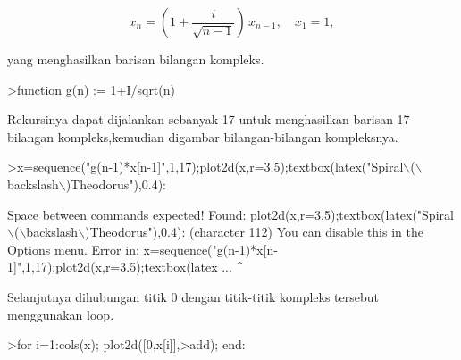 \documentclass[a4paper,10pt]{article}
\begin{document}
\begin{eulernotebook}
\begin{eulercomment}
\begin{eulercomment}
\begin{eulercomment}
\begin{eulercomment}
\begin{eulercomment}
\begin{eulercomment}
\begin{eulercomment}
\begin{eulercomment}
\begin{eulercomment}
\begin{eulercomment}
\begin{eulercomment}
\begin{eulercomment}
\begin{eulercomment}
\begin{eulercomment}
\begin{eulercomment}
\begin{eulercomment}
\begin{eulercomment}
\begin{eulercomment}
\begin{eulercomment}
\begin{eulercomment}
\begin{eulercomment}
\begin{eulercomment}
\begin{eulercomment}
\begin{eulercomment}
\begin{eulercomment}
\begin{eulercomment}
\begin{eulercomment}
\begin{eulercomment}
\begin{eulercomment}
\begin{eulercomment}
\begin{eulercomment}
\end{eulercomment}
\begin{eulerformula}
\[
x_n = \left( 1 + \frac{i}{\sqrt{n-1}} \right) \, x_{n-1}, \quad x_1=1,
\]
\end{eulerformula}
\begin{eulercomment}
yang menghasilkan barisan bilangan kompleks.
\end{eulercomment}
\begin{eulerprompt}
>function g(n) := 1+I/sqrt(n)
\end{eulerprompt}
\begin{eulercomment}
Rekursinya dapat dijalankan sebanyak 17 untuk menghasilkan barisan 17
bilangan kompleks,kemudian digambar bilangan-bilangan kompleksnya.
\end{eulercomment}
\begin{eulerprompt}
>x=sequence("g(n-1)*x[n-1]",1,17);plot2d(x,r=3.5);textbox(latex("Spiral\(\backslash\)(\(\backslash\)backslash\(\backslash\))Theodorus"),0.4):
\end{eulerprompt}
\begin{euleroutput}
  Space between commands expected!
  Found: plot2d(x,r=3.5);textbox(latex("Spiral\(\backslash\)(\(\backslash\)backslash\(\backslash\))Theodorus"),0.4): (character 112)
  You can disable this in the Options menu.
  Error in:
  x=sequence("g(n-1)*x[n-1]",1,17);plot2d(x,r=3.5);textbox(latex ...
                                   ^
\end{euleroutput}
\begin{eulercomment}
Selanjutnya dihubungan titik 0 dengan titik-titik kompleks tersebut
menggunakan loop.
\end{eulercomment}
\begin{eulerprompt}
>for i=1:cols(x); plot2d([0,x[i]],>add); end:
\end{eulerprompt}
\begin{eulercomment}

\end{eulercomment}
\end{eulercomment}
\end{eulercomment}
\end{eulercomment}
\end{eulercomment}
\end{eulercomment}
\end{eulercomment}
\end{eulercomment}
\end{eulercomment}
\end{eulercomment}
\end{eulercomment}
\end{eulercomment}
\end{eulercomment}
\end{eulercomment}
\end{eulercomment}
\end{eulercomment}
\end{eulercomment}
\end{eulercomment}
\end{eulercomment}
\end{eulercomment}
\end{eulercomment}
\end{eulercomment}
\end{eulercomment}
\end{eulercomment}
\end{eulercomment}
\end{eulercomment}
\end{eulercomment}
\end{eulercomment}
\end{eulercomment}
\end{eulercomment}
\end{eulercomment}
\end{eulernotebook}
\end{document}
